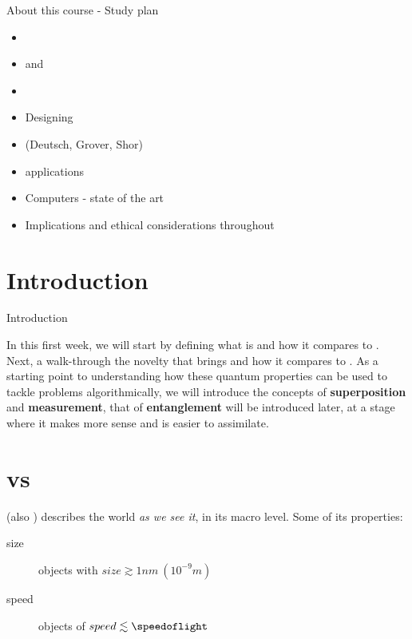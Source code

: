 \documentclass[aspectratio=43]{beamer}
\begin{document}
\begin{frame}{About this course - Study plan}
\begin{card}
    \begin{itemize}
        \item {}
        \item \qk and \ibmqe
        \item \qi
        \item Designing \qcts
        \item \qa (Deutsch, Grover, Shor)
        \item \qc applications
        \item \q Computers - state of the art
        \item Implications and ethical considerations throughout
    \end{itemize}
\end{card}
\pagenumber
\end{frame}

\section{Introduction}
\begin{frame}{Introduction}
\begin{card}
    In this first week, we will start by defining what \qc is and how it compares to \cc. Next, a walk-through the novelty that \qm brings and how it compares to \cp.  As a starting point to understanding how these quantum properties can be used to tackle problems algorithmically, we will introduce the concepts of \textbf{superposition} and \textbf{measurement}, that of \textbf{entanglement} will be introduced later, at a stage where it makes more sense and is easier to assimilate.
\end{card}
\pagenumber
\end{frame}


\section{\qp vs \cp}

\begin{frame}{\cp}
\begin{card}
    \cp (also \cm) describes the world \textit{as we see it}, in its macro level. Some of its properties:
    \begin{description}
        \item[size] objects with $size \gtrsim 1nm\ (10^{-9}m)$
        \item[speed] objects of $speed \lesssim \speedoflight$
    \end{description}
\end{card}
\pagenumber
\end{frame}
\end{document}
